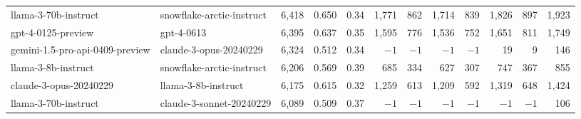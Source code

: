 \begin{tabular}{llrrrrrrrrrr}
llama-3-70b-instruct & snowflake-arctic-instruct & 6,418 & 0.650 & 0.34 & 1,771 & 862 & 1,714 & 839 & 1,826 & 897 & 1,923 \\
gpt-4-0125-preview & gpt-4-0613 & 6,395 & 0.637 & 0.35 & 1,595 & 776 & 1,536 & 752 & 1,651 & 811 & 1,749 \\
gemini-1.5-pro-api-0409-preview & claude-3-opus-20240229 & 6,324 & 0.512 & 0.34 & $-1$ & $-1$ & $-1$ & $-1$ & 19 & 9 & 146 \\
llama-3-8b-instruct & snowflake-arctic-instruct & 6,206 & 0.569 & 0.39 & 685 & 334 & 627 & 307 & 747 & 367 & 855 \\
claude-3-opus-20240229 & llama-3-8b-instruct & 6,175 & 0.615 & 0.32 & 1,259 & 613 & 1,209 & 592 & 1,319 & 648 & 1,424 \\
llama-3-70b-instruct & claude-3-sonnet-20240229 & 6,089 & 0.509 & 0.37 & $-1$ & $-1$ & $-1$ & $-1$ & $-1$ & $-1$ & 106 \\
\bottomrule
\end{tabular}